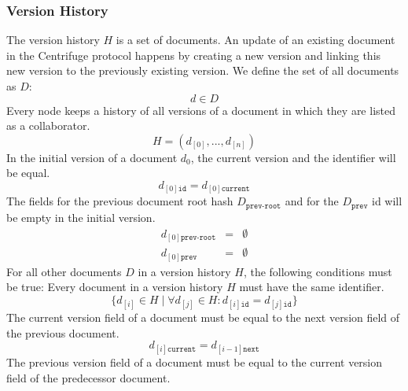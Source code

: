 \subsubsection{Version History}\label{sec:version_history}
The version history $H$ is a set of documents. An update of an existing document in the Centrifuge protocol happens by creating a new version and linking this new version to the previously existing version. 
We define the set of all documents as $D$:
\begin{equation}
d \in D
\end{equation}
Every node keeps a history of all versions of a document in which they are listed as a collaborator.
\begin{equation}
H = (d_{[0]},...,d_{[n]})
\end{equation}
\newline
In the initial version of a document $d_0$, the current version and the identifier will be equal.
\begin{equation}
d_{[0]{\texttt{id}}} = d_{[0]\texttt{current}}
\end{equation}
\newline
The fields for the previous document root hash $D_{\texttt{prev-root}}$ and for the $D_{\texttt{prev}}$ id will be empty in the initial version.
\begin{eqnarray}
d_{[0]{\texttt{prev-root}}}& = & \emptyset \\
d_{[0]{\texttt{prev}}} & = & \emptyset
\end{eqnarray}
\newline
For all other documents $D$ in a version history $H$, the following conditions must be true:
\newline
\newline
Every document in a version history $H$ must have the same identifier.
\begin{equation}
\{d_{[i]} \in H \mid \forall d_{[j]} \in H :d_{[i]\texttt{id}} = d_{[j]\texttt{id}} \}
\end{equation}
\newline
The current version field of a document must be equal to the next version field of the previous document.
\begin{equation}
d_{[i]\texttt{current}} = d_{[i-1]\texttt{next}} 
\end{equation}
\newline
The previous version field of a document must be equal to the current version field of the predecessor document.
